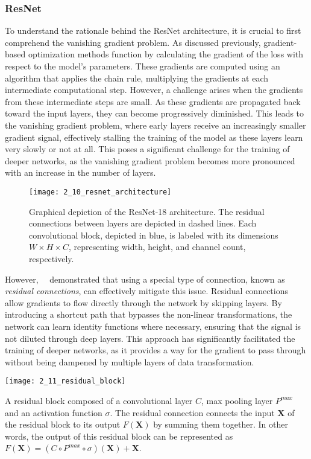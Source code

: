 \subsubsection{ResNet}
To understand the rationale behind the ResNet architecture, it is crucial to
first comprehend the vanishing gradient problem. As discussed previously,
gradient-based optimization methods function by calculating the gradient of the
loss with respect to the model's parameters. These gradients are computed using
an algorithm that applies the chain rule, multiplying the gradients at each
intermediate computational step. However, a challenge arises when the gradients
from these intermediate steps are small. As these gradients are propagated back
toward the input layers, they can become progressively diminished. This leads to
the vanishing gradient problem, where early layers receive an increasingly
smaller gradient signal, effectively stalling the training of the model as these
layers learn very slowly or not at all. This poses a significant challenge for
the training of deeper networks, as the vanishing gradient problem becomes more
pronounced with an increase in the number of layers.
\begin{figure*}
    \texttt{[image: 2\_10\_resnet\_architecture]}
    \caption[ResNet-18 Architecture]{Graphical depiction of the ResNet-18
    architecture. The residual connections between layers are depicted in dashed
    lines. Each convolutional block, depicted in blue, is labeled with its
    dimensions $W\times H \times C$, representing width, height, and channel
    count, respectively.}
\end{figure*}
However,~\citeauthor{he_resnet_2016}~\cite{he_resnet_2016} demonstrated that
using a special type of connection, known as \emph{residual connections}, can
effectively mitigate this issue. Residual connections allow gradients to flow
directly through the network by skipping layers. By introducing a shortcut path
that bypasses the non-linear transformations, the network can learn identity
functions where necessary, ensuring that the signal is not diluted through deep
layers. This approach has significantly facilitated the training of deeper
networks, as it provides a way for the gradient to pass through without being
dampened by multiple layers of data transformation.
\begin{marginfigure}[*-10]
   \texttt{[image: 2\_11\_residual\_block]}
   \caption[Residual Block]{A residual block composed of a convolutional layer
   $C$, max pooling layer $P^{max}$ and an activation function $\sigma$. The
   residual connection connects the input $\mathbf{X}$ of the residual block to
   its output $F(\mathbf{X})$ by summing them together. In other words, the
   output of this residual block can be represented as $F(\mathbf{X}) = (C \circ
   P^{max} \circ \sigma)(\mathbf{X}) + \mathbf{X}$.}
\end{marginfigure}
